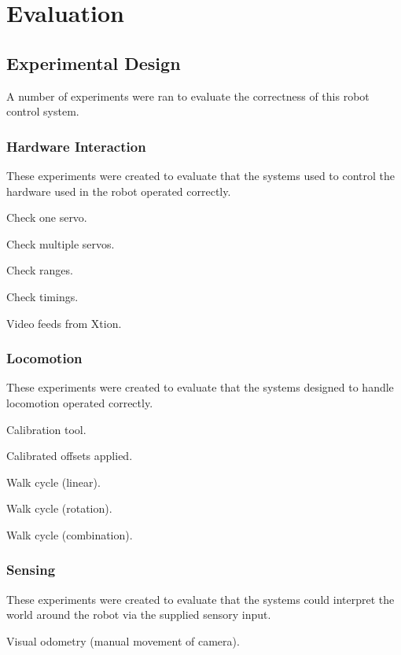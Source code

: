 \chapter{Evaluation}
\label{chap:evaluation}


\section{Experimental Design}

A number of experiments were ran to evaluate the correctness of this robot control system.

\subsection{Hardware Interaction}

These experiments were created to evaluate that the systems used to control the hardware used in the robot operated correctly.

Check one servo.

Check multiple servos.

Check ranges.

Check timings.

Video feeds from Xtion.

\subsection{Locomotion}

These experiments were created to evaluate that the systems designed to handle locomotion operated correctly.

Calibration tool.

Calibrated offsets applied.

Walk cycle (linear).

Walk cycle (rotation).

Walk cycle (combination). 

\subsection{Sensing}

These experiments were created to evaluate that the systems could interpret the world around the robot via the supplied sensory input.

Visual odometry (manual movement of camera).

